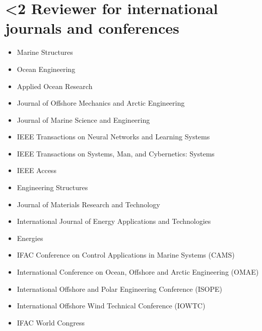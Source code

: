 \documentclass[10pt]{ctexart}
\begin{document}
\section*{\textbf{\ifnum\value{num}<2 {Reviewer for international journals and conferences}  \fi}}\vspace{-1.5em}
\begin{itemize}[label={}] \setlength\itemsep{0.0em}
\item Marine Structures%
\item Ocean Engineering%
\item Applied Ocean Research
\item Journal of Offshore Mechanics and Arctic Engineering%
\item Journal of Marine Science and Engineering%
\item IEEE Transactions on Neural Networks and Learning Systems%
\item IEEE Transactions on Systems, Man, and Cybernetics: Systems
\item IEEE Access%
\item Engineering Structures%
\item Journal of Materials Research and Technology%
\item International Journal of Energy Applications and Technologies%
\item Energies%
\item IFAC Conference on Control Applications in Marine Systems (CAMS)%
\item International Conference on Ocean, Offshore and Arctic Engineering (OMAE)%
\item International Offshore and Polar Engineering Conference (ISOPE)%
\item International Offshore Wind Technical Conference (IOWTC)%
\item IFAC World Congress%
\end{itemize}
\vspace*{0.1em}

\vspace{-2em}
\end{document}
